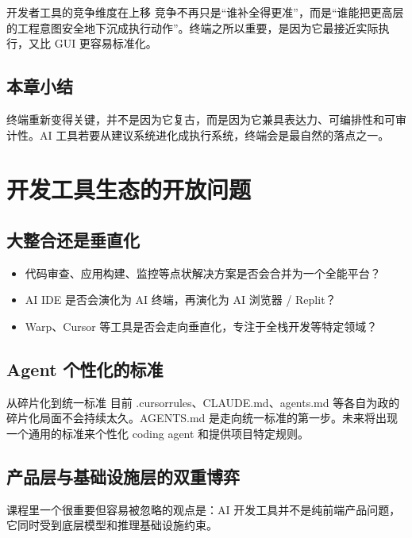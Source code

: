 \documentclass[a4paper]{article}
\begin{document}
\begin{importantbox}{开发者工具的竞争维度在上移}
竞争不再只是``谁补全得更准''，而是``谁能把更高层的工程意图安全地下沉成执行动作''。终端之所以重要，是因为它最接近实际执行，又比 GUI 更容易标准化。
\end{importantbox}

\subsection{本章小结}

终端重新变得关键，并不是因为它复古，而是因为它兼具表达力、可编排性和可审计性。AI 工具若要从建议系统进化成执行系统，终端会是最自然的落点之一。

\section{开发工具生态的开放问题}

\subsection{大整合还是垂直化}

\begin{itemize}
    \item 代码审查、应用构建、监控等点状解决方案是否会合并为一个全能平台？
    \item AI IDE 是否会演化为 AI 终端，再演化为 AI 浏览器 / Replit？
    \item Warp、Cursor 等工具是否会走向垂直化，专注于全栈开发等特定领域？
\end{itemize}

\subsection{Agent 个性化的标准}

\begin{importantbox}{从碎片化到统一标准}
目前 .cursorrules、CLAUDE.md、agents.md 等各自为政的碎片化局面不会持续太久。AGENTS.md 是走向统一标准的第一步。未来将出现一个通用的标准来个性化 coding agent 和提供项目特定规则。
\end{importantbox}

\subsection{产品层与基础设施层的双重博弈}

课程里一个很重要但容易被忽略的观点是：AI 开发工具并不是纯前端产品问题，它同时受到底层模型和推理基础设施约束。
\end{document}
